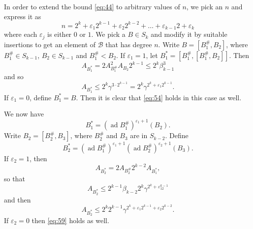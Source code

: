 \documentclass[leqno]{article}
\theoremstyle{plain}
\begin{document}
In order to extend the bound \eqref{eq:44} to arbitrary values of $n$, we pick an $n$ and express it as
\begin{equation}
	n=2^{k}+\varepsilon_{1} 2^{k-1}+\varepsilon_{2} 2^{k-2}+\ldots+\varepsilon_{k-1} 2 +\varepsilon_{k}
\end{equation}
where each $\varepsilon_{j}$ is either $0$ or $1$. 
We pick a $B \in S_{k}$ and modify it by suitable insertions to get an element of $\mathcal{B}$ that has degree $n$. 
Write $B=[B_{1}^{\#}, B_{2}]$, where $B_{1}^{\#} \in S_{k-1}$, $B_{2} \in S_{k-1}$ and $B_{1}^{\#} < B_{2}$.
If $\varepsilon_1=1$, let $B_{1}^{*}=[B_{1}^{\#},[B_{1}^{\#}, B_{2}]]$. 
Then
\begin{equation}
	A_{B_1^*} = 2 A_{B_1^\#}^{2} A_{B_{2}} 2^{k-1} \leq 2^{k} \beta_{k-1}^{3}
\end{equation}
and so
\begin{equation} \label{eq:54}
	A_{B_{1}^{*}} \leq 2^{k} \gamma^{3 \cdot 2^{k-1}}=2^{k} \gamma^{2^{k}+\varepsilon_1 2^{k-1}}.
\end{equation}
If $\varepsilon_{1}=0$, define $B_{1}^{*}=B$. Then it is clear that \eqref{eq:54} holds in this case as well.

We now have
\begin{equation}
	B_{1}^{*}=\left(\operatorname{ad} B_{1}^{\#}\right)^{\varepsilon_1+1}\left(B_{2}\right).
\end{equation}
Write $B_{2}=[B_{2}^{\#}, B_{3}]$, where $B_{2}^{\#}$ and $B_{3}$ are in $S_{k-2}$. Define
\begin{equation}
	B_{2}^{*}=\left(\operatorname{ad} B_{1}^{\#}\right)^{\varepsilon_{1}+1}\left(\operatorname{ad} B_{2}^{\#}\right)^{\varepsilon_{2}+1}\left(B_{3}\right).
\end{equation}
If $\varepsilon_{2}=1$, then
\begin{equation}
	A_{B_2^*} =2 A_{B_2^\#} 2^{k-2} A_{B_1^*},
\end{equation}
so that
\begin{equation}
	A_{B_2^*} \leq 2^{k-1} \beta_{k-2} 2^{k} \gamma^{2^{k}+\varepsilon_12^{k-1}} 
\end{equation}
and then
\begin{equation} \label{eq:59}
	A_{B_2^*} \leq 2^{k} 2^{k-1} \gamma^{2^{k}+\varepsilon_{1} 2^{k-1}+\varepsilon_{2} 2^{k-2}} .
\end{equation}
If $\varepsilon_{2}=0$ then \eqref{eq:59} holds as well.
\end{document}
